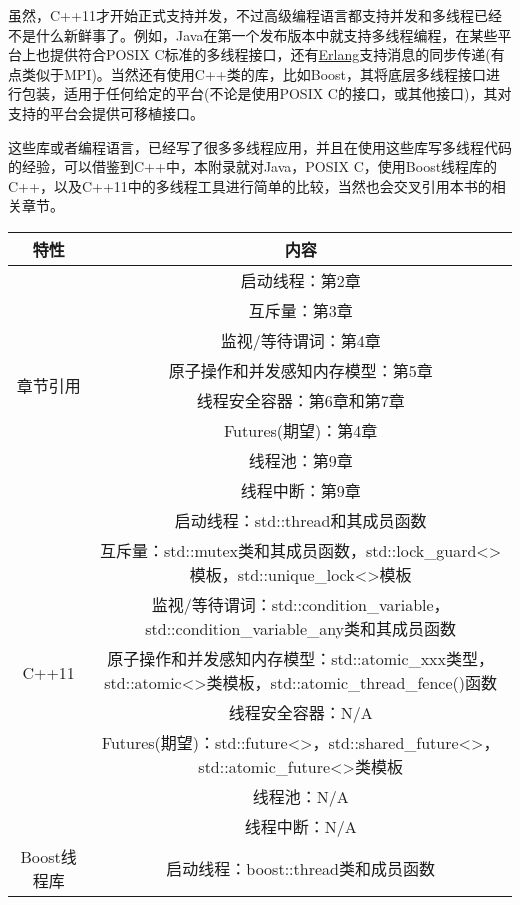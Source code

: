 
虽然，C++11才开始正式支持并发，不过高级编程语言都支持并发和多线程已经不是什么新鲜事了。例如，Java在第一个发布版本中就支持多线程编程，在某些平台上也提供符合POSIX C标准的多线程接口，还有\href{www.erlang.org}{Erlang}支持消息的同步传递(有点类似于MPI)。当然还有使用C++类的库，比如Boost，其将底层多线程接口进行包装，适用于任何给定的平台(不论是使用POSIX C的接口，或其他接口)，其对支持的平台会提供可移植接口。

这些库或者编程语言，已经写了很多多线程应用，并且在使用这些库写多线程代码的经验，可以借鉴到C++中，本附录就对Java，POSIX C，使用Boost线程库的C++，以及C++11中的多线程工具进行简单的比较，当然也会交叉引用本书的相关章节。

\begin{landscape}
\begin{table}[h]
\centering
\begin{adjustbox}{max width=\textwidth}
\begin{tabular}{|c|c|}
\hline
\textbf{特性} & \textbf{内容} \\
\hline
\multirow{8}{*}{章节引用} & 启动线程：第2章 \\
 & 互斥量：第3章 \\
 & 监视/等待谓词：第4章 \\
 & 原子操作和并发感知内存模型：第5章 \\
 & 线程安全容器：第6章和第7章 \\
 & Futures(期望)：第4章 \\
 & 线程池：第9章 \\
 & 线程中断：第9章 \\
\hline
\multirow{8}{*}{C++11} & 启动线程：std::thread和其成员函数 \\
 & 互斥量：std::mutex类和其成员函数，std::lock\_guard<>模板，std::unique\_lock<>模板 \\
 & 监视/等待谓词：std::condition\_variable，std::condition\_variable\_any类和其成员函数 \\
 & 原子操作和并发感知内存模型：std::atomic\_xxx类型，std::atomic<>类模板，std::atomic\_thread\_fence()函数 \\
 & 线程安全容器：N/A \\
 & Futures(期望)：std::future<>，std::shared\_future<>，std::atomic\_future<>类模板 \\
 & 线程池：N/A \\
 & 线程中断：N/A \\
\hline
\multirow{7}{*}{Boost线程库} & 启动线程：boost::thread类和成员函数 \\

\end{tabular}
\end{adjustbox}
\end{table}
\end{landscape}
